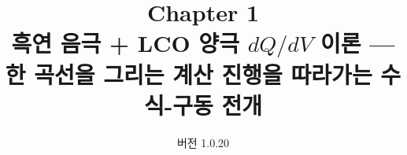 

\title{\textbf{\LARGE Chapter 1}\\[0.35em]\Large 흑연 음극 + LCO 양극 $dQ/dV$ 이론 --- 한 곡선을 그리는 계산 진행을 따라가는 수식-구동 전개}
\author{}
\date{\normalsize 버전 1.0.20}


\maketitle

























